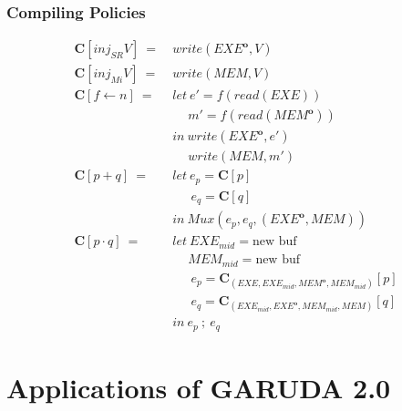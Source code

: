 \documentclass[12pt, letterpaper]{article}
\def \sysname {\textsc{GARUDA 2.0}\xspace}
\newcommand\obf[1]{#1^\mathbf{o}}
\begin{document}
      \subsubsection{Compiling Policies}\label{sec:compile:compile:pol}
          {\centering
          \begin{align*}
            \mathbf{C}[inj_{SR}V]\ 
              =\ &
              write(\obf{EXE}, V)\\
            \mathbf{C}[inj_{Mi}V]\ 
              =\ &
              write(MEM, V)\\
            \mathbf{C}[f \leftarrow n]\ 
              =\ &
              let\    e' = f(read(EXE))\\
              &\quad\ m' = f(read(\obf{MEM}))\\
              &in\ write(\obf{EXE}, e')\\
              &\quad \ write(MEM, m')\\
            \mathbf{C}[p + q]\ 
              =\ &
              let\      e_p = \mathbf{C}[p]\\
              &\quad\ \ e_q = \mathbf{C}[q]\\
              &in\ Mux(e_p, e_q, (\obf{EXE},MEM))\\
            \mathbf{C}[p \cdot q]\ 
              =\ &
              let\    EXE_{mid} = \text{new buf}\\
              &\quad\ MEM_{mid} = \text{new buf}\\
              &\quad\ \ e_p = \mathbf{C}_{( EXE, EXE_{mid}, \obf{MEM}, MEM_{mid}      )}[p]\\
              &\quad\ \ e_q = \mathbf{C}_{(      EXE_{mid}, \obf{EXE}, MEM_{mid}, MEM )}[q]\\
              &in\ e_p\ ;\ e_q
          \end{align*}}


  \clearpage
  \section{Applications of \sysname}
\end{document}
